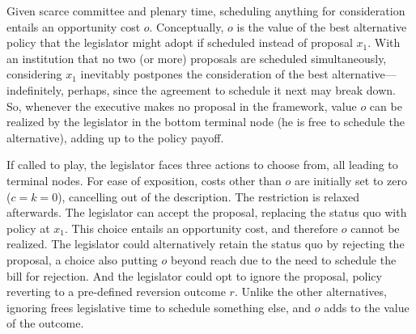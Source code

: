 \documentclass[letter,12pt]{article}
\begin{document}
Given scarce committee and plenary time, scheduling anything for consideration entails an opportunity cost $o$. Conceptually, $o$ is the value of the best alternative policy that the legislator might adopt if scheduled instead of proposal $x_1$. With an institution that no two (or more) proposals are scheduled simultaneously, considering $x_1$ inevitably postpones the consideration of the best alternative---indefinitely, perhaps, since the agreement to schedule it next may break down. So, whenever the executive makes no proposal in the framework, value $o$ can be realized by the legislator in the bottom terminal node (he is free to schedule the alternative), adding up to the policy payoff. 

If called to play, the legislator faces three actions to choose from, all leading to terminal nodes. For ease of exposition, costs other than $o$ are initially set to zero ($c = k = 0$), cancelling out of the description. The restriction is relaxed afterwards. The legislator can accept the proposal, replacing the status quo with policy at $x_1$. This choice entails an opportunity cost, and therefore $o$ cannot be realized. The legislator could alternatively retain the status quo by rejecting the proposal, a choice also putting $o$ beyond reach due to the need to schedule the bill for rejection. And the legislator could opt to ignore the proposal, policy reverting to a pre-defined reversion outcome $r$. Unlike the other alternatives, ignoring frees legislative time to schedule something else, and $o$ adds to the value of the outcome. 

%
%
%
%
\end{document}
